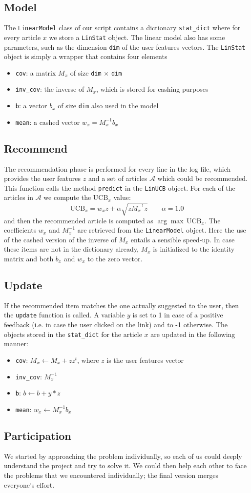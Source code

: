 \documentclass[a4paper, 11pt]{article}
\begin{document}
\subsection{Model}
The \verb!LinearModel! class of our script contains a dictionary \verb!stat_dict! where for every article $x$ we store a \verb!LinStat! object. The linear model also has some parameters, such as the dimension \verb!dim! of the user features vectors. The \verb!LinStat! object is simply a wrapper that contains four elements
\begin{itemize}
\item \verb!cov!: a matrix $M_x$ of size \verb!dim! $\times$ \verb!dim!
\item \verb!inv_cov!: the inverse of $M_x$, which is stored for cashing purposes
\item \verb!b!: a vector $b_x$ of size \verb!dim! also used in the model
\item \verb!mean!: a cashed vector $w_x = M_x^{-1}b_x$
\end{itemize}

\subsection{Recommend}
The recommendation phase is performed for every line in the log file, which provides the user features $z$ and a set of articles $\mathcal{A}$ which could be recommended. This function calls the method \verb!predict! in the \verb!LinUCB! object. For each of the articles in $\mathcal{A}$ we compute the $ \text{UCB}_x$ value:
\begin{equation}
\text{UCB}_x = w_xz + \alpha \sqrt{zM_x^{-1}z} \qquad \alpha=1.0
\end{equation}
and then the recommended article is computed as $\arg\max \, \text{UCB}_x$. The coefficients $w_x$ and $M_x^{-1}$ are retrieved from the \verb!LinearModel! object. Here the use of the cashed version of the inverse of $M_x$ entails a sensible speed-up. In case these items are not in the dictionary already, $M_x$ is initialized to the identity matrix and both $b_x$ and $w_x$ to the zero vector.

\subsection{Update}
If the recommended item matches the one actually suggested to the user, then the \verb!update! function is called. A variable $y$ is set to 1 in case of a positive feedback (i.e. in case the user clicked on the link) and to -1 otherwise.
The objects stored in the \verb!stat_dict! for the article $x$ are updated in the following manner:
\begin{itemize}
\item \verb!cov!: $M_x \leftarrow M_x+ zz^t$, where $z$ is the user features vector
\item \verb!inv_cov!: $M_x^{-1}$
\item \verb!b!: $b \leftarrow b + y*z$
\item \verb!mean!: $w_x \leftarrow M_x^{-1}b_x$
\end{itemize}

\subsection*{Participation}
We started by approaching the problem individually, so each of us could deeply understand the project and try to solve it. We could then help each other to face the problems that we encountered individually; the final version merges everyone's effort.
\end{document}
